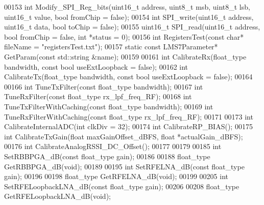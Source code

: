 \begin{DoxyCode}
00153     \textcolor{keywordtype}{int} Modify_SPI_Reg_bits(uint16\_t address, uint8\_t msb, uint8\_t lsb, uint16\_t value, \textcolor{keywordtype}{bool} fromChip = \textcolor{keyword}{
      false});
00154     \textcolor{keywordtype}{int} SPI_write(uint16\_t address, uint16\_t data, \textcolor{keywordtype}{bool} toChip = \textcolor{keyword}{false});
00155     uint16\_t SPI_read(uint16\_t address, \textcolor{keywordtype}{bool} fromChip = \textcolor{keyword}{false}, \textcolor{keywordtype}{int} *status = 0);
00156     \textcolor{keywordtype}{int} RegistersTest(\textcolor{keyword}{const} \textcolor{keywordtype}{char}* fileName = \textcolor{stringliteral}{"registersTest.txt"});
00157     \textcolor{keyword}{static} \textcolor{keyword}{const} LMS7Parameter* GetParam(\textcolor{keyword}{const} std::string &name);
00159 
00161     \textcolor{keywordtype}{int} CalibrateRx(float\_type bandwidth, \textcolor{keyword}{const} \textcolor{keywordtype}{bool} useExtLoopback = \textcolor{keyword}{false});
00162     \textcolor{keywordtype}{int} CalibrateTx(float\_type bandwidth, \textcolor{keyword}{const} \textcolor{keywordtype}{bool} useExtLoopback = \textcolor{keyword}{false});
00164 
00166     \textcolor{keywordtype}{int} TuneTxFilter(\textcolor{keyword}{const} float\_type bandwidth);
00167     \textcolor{keywordtype}{int} TuneRxFilter(\textcolor{keyword}{const} float\_type rx\_lpf\_freq\_RF);
00168     \textcolor{keywordtype}{int} TuneTxFilterWithCaching(\textcolor{keyword}{const} float\_type bandwidth);
00169     \textcolor{keywordtype}{int} TuneRxFilterWithCaching(\textcolor{keyword}{const} float\_type rx\_lpf\_freq\_RF);
00171 
00173     \textcolor{keywordtype}{int} CalibrateInternalADC(\textcolor{keywordtype}{int} clkDiv = 32);
00174     \textcolor{keywordtype}{int} CalibrateRP\_BIAS();
00175     \textcolor{keywordtype}{int} CalibrateTxGain(\textcolor{keywordtype}{float} maxGainOffset\_dBFS, \textcolor{keywordtype}{float} *actualGain\_dBFS);
00176     \textcolor{keywordtype}{int} CalibrateAnalogRSSI\_DC\_Offset();
00177 
00179 
00185     \textcolor{keywordtype}{int} SetRBBPGA\_dB(\textcolor{keyword}{const} float\_type gain);
00186 
00188     float\_type GetRBBPGA\_dB(\textcolor{keywordtype}{void});
00189 
00195     \textcolor{keywordtype}{int} SetRFELNA\_dB(\textcolor{keyword}{const} float\_type gain);
00196 
00198     float\_type GetRFELNA\_dB(\textcolor{keywordtype}{void});
00199 
00205     \textcolor{keywordtype}{int} SetRFELoopbackLNA\_dB(\textcolor{keyword}{const} float\_type gain);
00206 
00208     float\_type GetRFELoopbackLNA\_dB(\textcolor{keywordtype}{void});

\end{DoxyCode}
